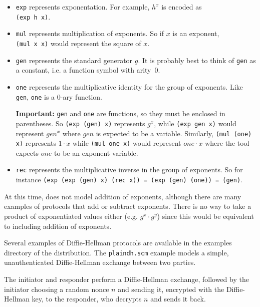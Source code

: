 \begin{itemize}
\item \texttt{exp} represents exponentation.  For example, $h^x$ is
encoded as \\ \texttt{(exp h x)}.
\item \texttt{mul} represents multiplication of exponents.  So if $x$
is an exponent, \\ \texttt{(mul x x)} would represent the square of $x$.
\item \texttt{gen} represents the standard generator $g$.  It is
  probably best to think of \texttt{gen} as a constant, i.e. a
  function symbol with arity~0.

\item \texttt{one} represents the multiplicative identity for the group of
exponents.  Like \texttt{gen}, \texttt{one} is a 0-ary function.

{\bf Important: } \texttt{gen} and \texttt{one} are functions, so they
must be enclosed in parentheses.  So \texttt{(exp (gen) x)} represents
$g^x$, while \texttt{(exp gen x)} would represent ${gen}^x$ where
${gen}$ is expected to be a variable.  Similarly, \texttt{(mul (one)
  x)} represents $1 \cdot x$ while \texttt{(mul one x)} would
represent $one \cdot x$ where the tool expects $one$ to be an exponent
variable.

\item \texttt{rec} represents the multiplicative inverse in the group
  of exponents.  So for instance \texttt{(exp (exp (gen) x) (rec x)) =
    (exp (gen) (one)) = (gen)}.
\end{itemize}

At this time, {\cpsa} does not model addition of exponents, although
there are many examples of protocols that add or subtract exponents.
There is no way to take a product of exponentiated values either
(e.g. $g^x \cdot g^y$) since this would be equivalent to including
addition of exponents.

Several examples of Diffie-Hellman protocols are available in the examples
directory of the distribution.  The \texttt{plaindh.scm} example models
a simple, unauthenticated Diffie-Hellman exchange between two parties.

The initiator and responder perform a Diffie-Hellman exchange, followed by
the initiator choosing a random nonce $n$ and sending it, encrypted with the
Diffie-Hellman key, to the responder, who decrypts $n$ and sends it back.

